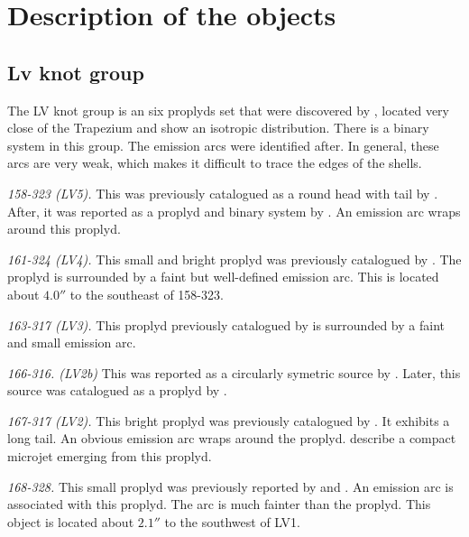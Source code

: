\documentclass{article}
\begin{document}

\section{Description of the objects}
\label{sec:descrip}

\subsection{Lv knot group}
\label{sec:lv}

The LV knot group is an six proplyds set that were discovered by \citet{Laques:1979}, located very close of the Trapezium and show an isotropic distribution. There is  a binary system in this group. The emission arcs were identified after. In general, these arcs are very weak, which makes it difficult to trace the edges of the shells.

\textit{158-323 (LV5).} This was previously catalogued as a round head with tail by \citet{Odell:1996}. After, it was reported as a proplyd and binary system by \citep{Ricci:2008}. An emission arc wraps around this proplyd. 
 
\textit{161-324 (LV4).} This small and bright proplyd was previously catalogued by \citet{Odell:1996, Ricci:2008}. The proplyd is surrounded by a faint but well-defined emission arc. This is located about \(4.0''\) to the southeast of 158-323.

\textit{163-317 (LV3).} This proplyd previously catalogued by \citet{Odell:1996, Ricci:2008} is surrounded by a faint and small emission arc. 

\textit{166-316. (LV2b)} This was reported as a circularly symetric source by \citet{Odell:1996}. Later, this source was catalogued as a proplyd by \citet{Ricci:2008}. 

\textit{167-317 (LV2).} This bright proplyd was previously catalogued by \citet{Odell:1994, Ricci:2008}. It exhibits a long tail. An obvious emission arc \citep{Bally:2000a} wraps around the proplyd. \citet{Bally:2000a} describe a compact microjet emerging from this proplyd. 

\textit{168-328.} This small proplyd was previously reported by \citet{Odell:1994} and \citet{Ricci:2008}. An emission arc is associated with this proplyd. The arc is much fainter than the proplyd. This object is located about \(2.1''\) to the southwest of LV1.  
\end{document}
